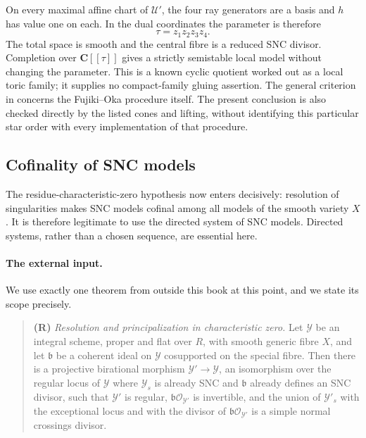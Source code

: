 \begin{example}
On every maximal affine chart of $\mathcal U'$, the four ray
generators are a basis and $h$ has value one on each. In the dual
coordinates the parameter is therefore
\[
                         \tau=z_1z_2z_3z_4.
\]
The total space is smooth and the central fibre is a reduced SNC
divisor. Completion over $\mathbf C[[\tau]]$ gives a strictly
semistable local model without changing the parameter. This is a
known cyclic quotient worked out as a local toric family; it supplies
no compact-family gluing assertion. The general criterion in
\cite[Theorem~3.1]{SS20FujikiV4} concerns the Fujiki--Oka procedure
itself. The present conclusion is also checked directly by the
listed cones and lifting, without identifying this particular star
order with every implementation of that procedure.
\end{example}

\subsection{Cofinality of SNC models}

The residue-characteristic-zero hypothesis now enters decisively:
resolution of singularities makes SNC models cofinal among all models of the
smooth variety $X$. It is therefore legitimate to use the directed system
of SNC models. Directed systems, rather than a chosen sequence, are
essential here.

\paragraph{The external input.}
We use exactly one theorem from outside this book at this point, and we
state its scope precisely.

\begin{quote}
\textbf{(R)} \emph{Resolution and principalization in characteristic zero.}
Let $\mathcal Y$ be an integral scheme, proper and flat over $R$, with
smooth generic fibre $X$, and let $\mathfrak b$ be a coherent ideal on
$\mathcal Y$ cosupported on the special fibre. Then there is a projective
birational morphism $\mathcal Y'\to\mathcal Y$, an isomorphism over the
regular locus of $\mathcal Y$ where $\mathcal Y_s$ is already SNC and
$\mathfrak b$ already defines an SNC divisor, such that $\mathcal Y'$ is
regular, $\mathfrak b\mathcal O_{\mathcal Y'}$ is invertible, and the
union of $\mathcal Y'_s$ with the exceptional locus and with the divisor
of $\mathfrak b\mathcal O_{\mathcal Y'}$ is a simple normal crossings
divisor.
\end{quote}

